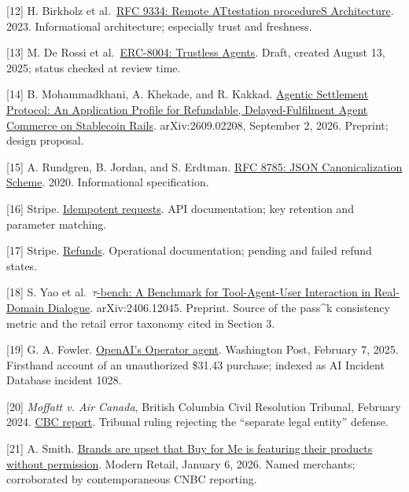 \documentclass[
  11pt,
  letterpaper,
]{article}
\begin{document}
{[}12{]} H. Birkholz et
al.~\href{https://www.rfc-editor.org/rfc/rfc9334}{RFC 9334: Remote
ATtestation procedureS Architecture}. 2023. Informational architecture;
especially trust and freshness.

{[}13{]} M. De Rossi et
al.~\href{https://eips.ethereum.org/EIPS/eip-8004}{ERC-8004: Trustless
Agents}. Draft, created August 13, 2025; status checked at review time.

{[}14{]} B. Mohammadkhani, A. Khekade, and R. Kakkad.
\href{https://arxiv.org/abs/2609.02208}{Agentic Settlement Protocol: An
Application Profile for Refundable, Delayed-Fulfilment Agent Commerce on
Stablecoin Rails}. arXiv:2609.02208, September 2, 2026. Preprint; design
proposal.

{[}15{]} A. Rundgren, B. Jordan, and S. Erdtman.
\href{https://www.rfc-editor.org/rfc/rfc8785}{RFC 8785: JSON
Canonicalization Scheme}. 2020. Informational specification.

{[}16{]} Stripe.
\href{https://docs.stripe.com/api/idempotent_requests}{Idempotent
requests}. API documentation; key retention and parameter matching.

{[}17{]} Stripe. \href{https://docs.stripe.com/refunds}{Refunds}.
Operational documentation; pending and failed refund states.

{[}18{]} S. Yao et
al.~\href{https://arxiv.org/abs/2406.12045}{\(\tau\)-bench: A Benchmark
for Tool-Agent-User Interaction in Real-Domain Dialogue}.
arXiv:2406.12045. Preprint. Source of the pass\^{}k consistency metric
and the retail error taxonomy cited in Section 3.

{[}19{]} G. A. Fowler.
\href{https://www.washingtonpost.com/technology/2025/02/07/openai-operator-ai-agent-chatgpt/}{OpenAI's
Operator agent}. Washington Post, February 7, 2025. Firsthand account of
an unauthorized \$31.43 purchase; indexed as AI Incident Database
incident 1028.

{[}20{]} \emph{Moffatt v. Air Canada}, British Columbia Civil Resolution
Tribunal, February 2024.
\href{https://www.cbc.ca/news/canada/british-columbia/air-canada-chatbot-lawsuit-1.7116416}{CBC
report}. Tribunal ruling rejecting the ``separate legal entity''
defense.

{[}21{]} A. Smith.
\href{https://www.modernretail.co/technology/brands-are-upset-that-buy-for-me-is-featuring-their-products-on-amazon-without-permission/}{Brands
are upset that Buy for Me is featuring their products without
permission}. Modern Retail, January 6, 2026. Named merchants;
corroborated by contemporaneous CNBC reporting.
\end{document}
